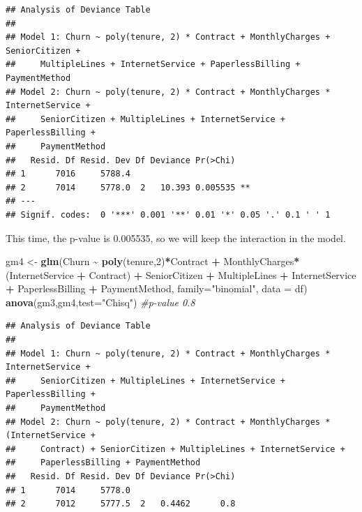 \documentclass[
]{article}
\newenvironment{Shaded}{\begin{snugshade}}{\end{snugshade}}
\newcommand{\AttributeTok}[1]{\textcolor[rgb]{0.13,0.29,0.53}{#1}}
\newcommand{\CommentTok}[1]{\textcolor[rgb]{0.56,0.35,0.01}{\textit{#1}}}
\newcommand{\DecValTok}[1]{\textcolor[rgb]{0.00,0.00,0.81}{#1}}
\newcommand{\FunctionTok}[1]{\textcolor[rgb]{0.13,0.29,0.53}{\textbf{#1}}}
\newcommand{\NormalTok}[1]{#1}
\newcommand{\OtherTok}[1]{\textcolor[rgb]{0.56,0.35,0.01}{#1}}
\newcommand{\SpecialCharTok}[1]{\textcolor[rgb]{0.81,0.36,0.00}{\textbf{#1}}}
\newcommand{\StringTok}[1]{\textcolor[rgb]{0.31,0.60,0.02}{#1}}
\begin{document}
\begin{verbatim}
## Analysis of Deviance Table
## 
## Model 1: Churn ~ poly(tenure, 2) * Contract + MonthlyCharges + SeniorCitizen + 
##     MultipleLines + InternetService + PaperlessBilling + PaymentMethod
## Model 2: Churn ~ poly(tenure, 2) * Contract + MonthlyCharges * InternetService + 
##     SeniorCitizen + MultipleLines + InternetService + PaperlessBilling + 
##     PaymentMethod
##   Resid. Df Resid. Dev Df Deviance Pr(>Chi)   
## 1      7016     5788.4                        
## 2      7014     5778.0  2   10.393 0.005535 **
## ---
## Signif. codes:  0 '***' 0.001 '**' 0.01 '*' 0.05 '.' 0.1 ' ' 1
\end{verbatim}

This time, the p-value is 0.005535, so we will keep the interaction in
the model.

\begin{Shaded}
\begin{Highlighting}[]
\NormalTok{gm4 }\OtherTok{\textless{}{-}} \FunctionTok{glm}\NormalTok{(Churn }\SpecialCharTok{\textasciitilde{}} \FunctionTok{poly}\NormalTok{(tenure,}\DecValTok{2}\NormalTok{)}\SpecialCharTok{*}\NormalTok{Contract }\SpecialCharTok{+}\NormalTok{ MonthlyCharges}\SpecialCharTok{*}\NormalTok{(InternetService }\SpecialCharTok{+}\NormalTok{ Contract) }\SpecialCharTok{+}\NormalTok{ SeniorCitizen }\SpecialCharTok{+}\NormalTok{ MultipleLines }\SpecialCharTok{+}\NormalTok{ InternetService }\SpecialCharTok{+}\NormalTok{ PaperlessBilling }\SpecialCharTok{+}\NormalTok{ PaymentMethod, }\AttributeTok{family=}\StringTok{"binomial"}\NormalTok{, }\AttributeTok{data =}\NormalTok{ df)}
\FunctionTok{anova}\NormalTok{(gm3,gm4,}\AttributeTok{test=}\StringTok{"Chisq"}\NormalTok{) }\CommentTok{\#p{-}value 0.8 }
\end{Highlighting}
\end{Shaded}

\begin{verbatim}
## Analysis of Deviance Table
## 
## Model 1: Churn ~ poly(tenure, 2) * Contract + MonthlyCharges * InternetService + 
##     SeniorCitizen + MultipleLines + InternetService + PaperlessBilling + 
##     PaymentMethod
## Model 2: Churn ~ poly(tenure, 2) * Contract + MonthlyCharges * (InternetService + 
##     Contract) + SeniorCitizen + MultipleLines + InternetService + 
##     PaperlessBilling + PaymentMethod
##   Resid. Df Resid. Dev Df Deviance Pr(>Chi)
## 1      7014     5778.0                     
## 2      7012     5777.5  2   0.4462      0.8
\end{verbatim}
\end{document}
